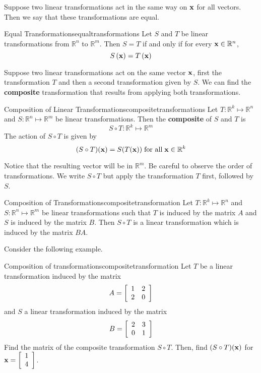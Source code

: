 Suppose two linear transformations act in the same way on ${\bf x}$ for all vectors. Then we say that these transformations are equal.

\begin{definition}{Equal Transformations}{equaltransformations}
Let $S$ and $T$ be linear transformations from $\mathbb{R}^n$ to $\mathbb{R}^m$. Then $S = T$ if and only if for every ${\bf x} \in \mathbb{R}^n$, 
\[
S \left( {\bf x} \right) = T \left( {\bf x} \right)
\]
\end{definition}

Suppose two linear transformations act on the same vector ${\bf x}$, first the transformation $T$ and then a second transformation given by $S$. We can find the \textbf{composite} transformation that results from applying both transformations.

\begin{definition}{Composition of Linear Transformations}{compositetransformations}
Let $T: \mathbb{R}^k \mapsto \mathbb{R}^n$ and $S: \mathbb{R}^n \mapsto \mathbb{R}^m$ be linear transformations. Then the \textbf{composite} of $S$ and $T$ is 
\[
S \circ T: \mathbb{R}^k \mapsto \mathbb{R}^m
\]
The action of $S \circ T$ is given by 
\[
(S \circ T) ({\bf x}) = S(T({\bf x})) \; \mbox{for all} \; {\bf x} \in \mathbb{R}^k
\]
\end{definition}

Notice that the resulting vector will be in $\mathbb{R}^m$. Be careful to observe the order of transformations. We write $S \circ T$ but apply the transformation $T$ first, followed by $S$. 

\begin{theorem}{Composition of Transformations}{compositetransformation}
Let $T: \mathbb{R}^k \mapsto \mathbb{R}^n$ and $S: \mathbb{R}^n \mapsto \mathbb{R}^m$ be linear transformations such that $T$ is induced by the matrix $A$ and $S$ is induced by the matrix $B$. Then $S \circ T$ is a linear transformation which is induced by the matrix $BA$.
\end{theorem}

Consider the following example. 

\begin{example}{Composition of transformations}{compositetransformation}
Let $T$ be a linear transformation induced by the matrix 
\[
A = 
\left[
\begin{array}{rr}
1 & 2 \\
2 & 0 
\end{array}
\right]
\]
and $S$ a linear transformation induced by the matrix
\[
B = 
\left[
\begin{array}{rr}
2 & 3 \\
0 & 1
\end{array}
\right]
\]
Find the matrix of the composite transformation $S \circ T$. Then, find $(S \circ T)({\bf x})$ for ${\bf x} = \left[
\begin{array}{r}
1 \\
4 
\end{array}
\right]$.
\end{example}

